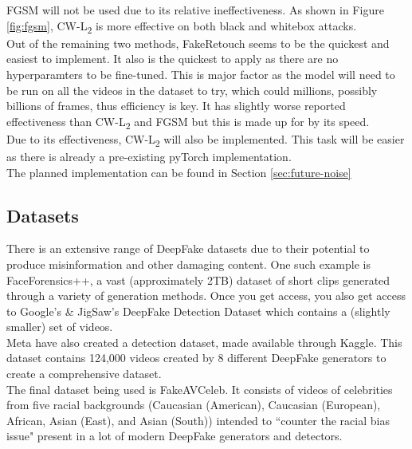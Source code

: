 \documentclass{article}
\begin{document}
FGSM will not be used due to its relative ineffectiveness. As shown in Figure \ref{fig:fgsm}, CW-L\textsubscript{2} is more effective on both black and whitebox attacks.\\

Out of the remaining two methods, FakeRetouch seems to be the quickest and easiest to implement. It also is the quickest to apply as there are no hyperparamters to be fine-tuned\cite{huang2020fakeretouch}. This is major factor as the model will need to be run on all the videos in the dataset to try, which could millions, possibly billions of frames, thus efficiency is key. It has slightly worse reported effectiveness than CW-L\textsubscript{2} and FGSM but this is made up for by its speed.\\

Due to its effectiveness, CW-L\textsubscript{2} will also be implemented. This task will be easier as there is already a pre-existing pyTorch implementation\cite{cwl2python}.\\

The planned implementation can be found in Section \ref{sec:future-noise}

\subsection{Datasets}

There is an extensive range of DeepFake datasets due to their potential to produce misinformation and other damaging content. One such example is FaceForensics++\cite{roessler2019faceforensicspp}, a vast (approximately 2TB) dataset of short clips generated through a variety of generation methods. Once you get access, you also get access to Google's \& JigSaw's DeepFake Detection Dataset\cite{DDD_GoogleJigSaw2019} which contains a (slightly smaller) set of videos.\\

Meta have also created a detection dataset\cite{DFDC2020}, made available through Kaggle\cite{kagglemeta}. This dataset contains 124,000 videos created by 8 different DeepFake generators to create a comprehensive dataset.\\

The final dataset being used is FakeAVCeleb\cite{khalid2021fakeavceleb}. It consists of videos of celebrities from five racial backgrounds (Caucasian (American),  Caucasian (European), African, Asian (East), and Asian (South)) intended to ``counter the racial bias issue" present in a lot of modern DeepFake generators and detectors.
\end{document}
